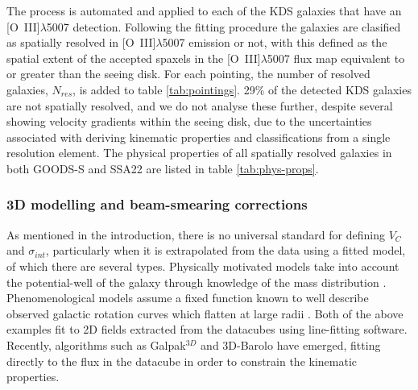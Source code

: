 \documentclass[fleqn,usenatbib]{mn2e}
\begin{document}
The process is automated and applied to each of the KDS galaxies that have an [O~{\sc III}]$\lambda$5007 detection.
Following the fitting procedure the galaxies are clasified as spatially resolved in [O~{\sc III}]$\lambda$5007 emission or not, with this defined as  the spatial extent of the accepted spaxels in the [O~{\sc III}]$\lambda$5007 flux map equivalent to or greater than the seeing disk.
For each pointing, the number of resolved galaxies, $N_{res}$, is added to table \ref{tab:pointings}.
29\% of the detected KDS galaxies are not spatially resolved, and we do not analyse these further, despite several showing velocity gradients within the seeing disk, due to the uncertainties associated with deriving kinematic properties and classifications from a single resolution element.
The physical properties of all spatially resolved galaxies in both GOODS-S and SSA22 are listed in table \ref{tab:phys-props}.

\subsubsection{3D modelling and beam-smearing corrections}\label{subsec:3d_modelling}

As mentioned in the introduction, there is no universal standard for defining $V_{C}$ and $\sigma_{int}$, particularly when it is extrapolated from the data using a fitted model, of which there are several types.
Physically motivated models take into account the potential-well of the galaxy through knowledge of the mass distribution \citep[e.g.][]{Genzel2008,ForsterSchreiber2009,Gnerucci2011,Wisnioski2015}.
Phenomenological models assume a fixed function known to well describe observed galactic rotation curves which flatten at large radii \citep[e.g.][]{Epinat2010,Epinat2012,Swinbank2012,Stott2016,Harrison2017}.
Both of the above examples fit to 2D fields extracted from the datacubes using line-fitting software.
Recently, algorithms such as Galpak$^{3D}$ \citep{Bouche2015} and 3D-Barolo \citep{DiTeodoro2015} have emerged, fitting directly to the flux in the datacube in order to constrain the kinematic properties.
\end{document}
